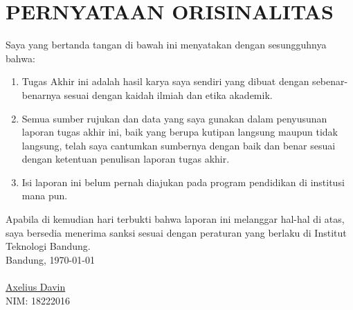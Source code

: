 \chapter*{PERNYATAAN ORISINALITAS}
\vspace{2cm}
Saya yang bertanda tangan di bawah ini menyatakan dengan sesungguhnya bahwa:
\begin{enumerate}
    \item Tugas Akhir ini adalah hasil karya saya sendiri yang dibuat dengan sebenar-benarnya sesuai dengan kaidah ilmiah dan etika akademik.
    \item Semua sumber rujukan dan data yang saya gunakan dalam penyusunan laporan tugas akhir ini, baik yang berupa kutipan langsung maupun tidak langsung, telah saya cantumkan sumbernya dengan baik dan benar sesuai dengan ketentuan penulisan laporan tugas akhir.
    \item Isi laporan ini belum pernah diajukan pada program pendidikan di institusi mana pun.
\end{enumerate}
Apabila di kemudian hari terbukti bahwa laporan ini melanggar hal-hal di atas, saya bersedia menerima sanksi sesuai dengan peraturan yang berlaku di Institut Teknologi Bandung.
\\[2cm]
Bandung, \today\\
\\[2cm]

\underline{Axelius Davin} \\
NIM: 18222016
  